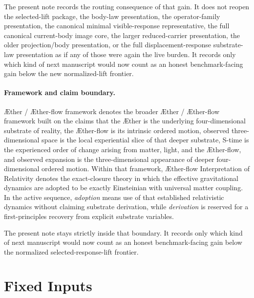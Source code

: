 \documentclass[11pt]{article}
\newcommand{\Aether}{\AE{}ther}
\newcommand{\Aflow}{\AE{}ther-flow}
\newcommand{\TheoryName}{\Aflow{} Interpretation of Relativity}
\newcommand{\TheoryProgram}{\Aether{} / \Aflow{} framework}
\begin{document}
The present note records the routing consequence of that gain. It does not reopen the selected-lift package, the body-law presentation, the operator-family presentation, the canonical minimal visible-response representative, the full canonical current-body image core, the larger reduced-carrier presentation, the older projection/body presentation, or the full displacement-response substrate-law presentation as if any of those were again the live burden. It records only which kind of next manuscript would now count as an honest benchmark-facing gain below the new normalized-lift frontier.

\paragraph{Framework and claim boundary.}
\TheoryProgram{} denotes the broader \Aether{} / \Aflow{} framework built on the claims that the \Aether{} is the underlying four-dimensional substrate of reality, the \Aflow{} is its intrinsic ordered motion, observed three-dimensional space is the local experiential slice of that deeper substrate, S-time is the experienced order of change arising from matter, light, and the \Aflow{}, and observed expansion is the three-dimensional appearance of deeper four-dimensional ordered motion. Within that framework, \TheoryName{} denotes the exact-closure theory in which the effective gravitational dynamics are adopted to be exactly Einsteinian with universal matter coupling. In the active sequence, \emph{adoption} means use of that established relativistic dynamics without claiming substrate derivation, while \emph{derivation} is reserved for a first-principles recovery from explicit substrate variables.

The present note stays strictly inside that boundary. It records only which kind of next manuscript would now count as an honest benchmark-facing gain below the normalized selected-response-lift frontier.

\section{Fixed Inputs}
\end{document}
